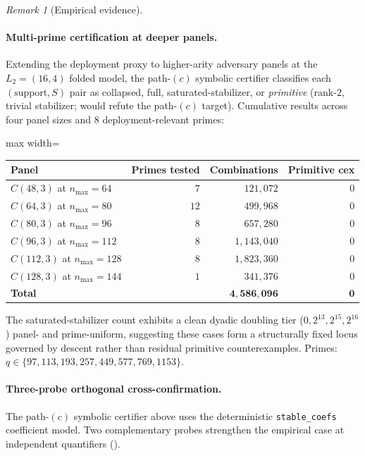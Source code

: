 \documentclass[11pt]{article}
\theoremstyle{definition}
\theoremstyle{remark}
\newtheorem{remark}[theorem]{Remark}
\begin{document}
\begin{remark}[Empirical evidence]
\paragraph{Multi-prime certification at deeper panels.}
Extending the deployment proxy to higher-arity adversary panels at
the $L_2 = (16, 4)$ folded model, the path-$(c)$ symbolic certifier
classifies each $(\mathrm{support}, S)$ pair as collapsed, full,
saturated-stabilizer, or \emph{primitive} (rank-$2$, trivial
stabilizer; would refute the path-$(c)$ target). Cumulative results
across four panel sizes and $8$ deployment-relevant primes:

\begin{center}
\begin{adjustbox}{max width=\textwidth}
\begin{tabular}{lrrr}
\toprule
Panel & Primes tested & Combinations & Primitive cex \\
\midrule
$C(48, 3)$ at $n_{\max} = 64$ & $7$ & $121{,}072$ & $0$ \\
$C(64, 3)$ at $n_{\max} = 80$ & $12$ & $499{,}968$ & $0$ \\
$C(80, 3)$ at $n_{\max} = 96$ & $8$ & $657{,}280$ & $0$ \\
$C(96, 3)$ at $n_{\max} = 112$ & $8$ & $1{,}143{,}040$ & $0$ \\
$C(112, 3)$ at $n_{\max} = 128$ & $8$ & $1{,}823{,}360$ & $0$ \\
$C(128, 3)$ at $n_{\max} = 144$ & $1$ & $341{,}376$ & $0$ \\
\midrule
\textbf{Total} & & $\mathbf{4{,}586{,}096}$ & $\mathbf{0}$ \\
\bottomrule
\end{tabular}
\end{adjustbox}
\end{center}

The saturated-stabilizer count exhibits a clean dyadic doubling
tier ($0, 2^{13}, 2^{15}, 2^{16}$) panel- and prime-uniform,
suggesting these cases form a structurally fixed locus governed
by descent rather than residual primitive counterexamples. Primes:
$q \in \{97, 113, 193, 257, 449, 577, 769, 1153\}$.

\paragraph{Three-probe orthogonal cross-confirmation.}
The path-$(c)$ symbolic certifier above uses the deterministic
\texttt{stable\_coefs} coefficient model. Two complementary probes
strengthen the empirical case at independent quantifiers
(\cite{CompanionRepo}).


\end{remark}
\end{document}
